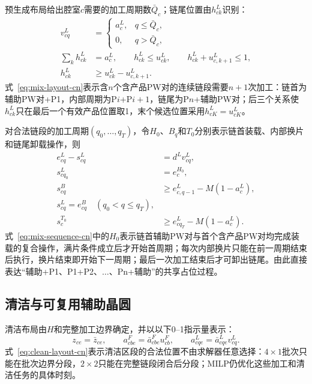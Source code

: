 \documentclass[journal]{IEEEtran}
\begin{document}
预生成布局给出腔室$c$需要的加工周期数$\bar Q_c$；链尾位置由$h^L_{ck}$识别：
\begin{equation}
\begin{aligned}
v^L_{cq}&=
\begin{cases}a^L_c,&q\le\bar Q_c,\\0,&q>\bar Q_c,
\end{cases}\\
\sum_k h^L_{ck}&=a^L_c,\qquad
h^L_{ck}\le u^L_{ck},\qquad
h^L_{ck}+u^L_{c,k+1}\le1,\\
h^L_{ck}&\ge u^L_{ck}-u^L_{c,k+1}.
\end{aligned}
\label{eq:mix-layout-cn}
\end{equation}
式~\eqref{eq:mix-layout-cn}表示含$n$个含产品PW对的连续链段需要$n+1$次加工：链首为辅助PW对+P1，内部周期为P$i$+P$i+1$，链尾为P$n$+辅助PW对；后三个关系使$h^L_{ck}$只在最后一个有效产品位置取1，末个候选位置采用$h^L_{cK}=u^L_{cK}$。

对合法链段的加工周期$(q_0,\ldots,q_T)$，令$H_0$、$B_q$和$T_0$分别表示链首装载、内部换片和链尾卸载操作，则
\begin{equation}
\begin{aligned}
e^L_{cq}-s^L_{cq}&=d^L v^L_{cq},\\
s^L_{cq_0}&=e^{H_0}_c,\\
s^{B}_{cq}&\ge e^L_{c,q-1}-M(1-a^L_c),\\
s^L_{cq}=e^{B}_{cq}\quad(q_0<q\le q_T),\\
s^{T_0}_c&\ge e^L_{cq_T}-M(1-a^L_c).
\end{aligned}
\label{eq:mix-sequence-cn}
\end{equation}
式~\eqref{eq:mix-sequence-cn}中的$H_0$表示链首辅助PW对与首个含产品PW对均完成装载的复合操作，满片条件成立后才开始首周期；每次内部换片只能在前一周期结束后执行，换片结束即开始下一周期；最后一次加工结束后才可卸出链尾。由此直接表达“辅助+P1、P1+P2、$\ldots$、Pn+辅助”的共享占位过程。

\subsection{清洁与可复用辅助晶圆}

清洁布局由$H$和完整加工边界确定，并以以下0--1指示量表示：
\begin{equation}
z_{ce}=\bar z_{ce},\qquad
a^F_{cbe}=\bar a^F_{cbe}u^F_{cb},\qquad
a^L_{cqe}=\bar a^L_{cqe}v^L_{cq}.
\label{eq:clean-layout-cn}
\end{equation}
式~\eqref{eq:clean-layout-cn}表示清洁区段的合法位置不由求解器任意选择：$4\times1$批次只能在批次边界分段，$2\times2$只能在完整链段闭合后分段；MILP仍优化这些加工和清洁任务的具体时刻。
\end{document}
